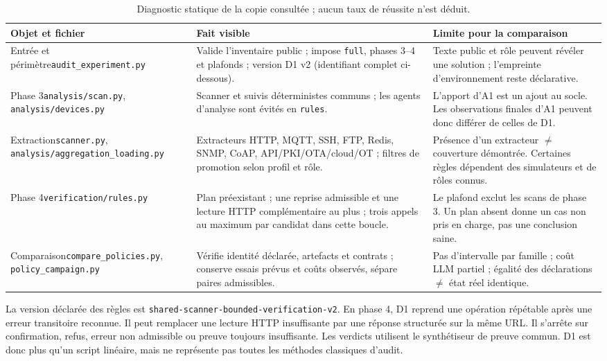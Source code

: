 \documentclass[11pt,a4paper]{article}
\newcommand{\fichier}[1]{\nolinkurl{#1}}
\begin{document}
\begin{table}[htbp]
\caption{Diagnostic statique de la copie consultée ; aucun taux de réussite n'est déduit.}
\label{tab:code}
\small
\begin{tabularx}{\linewidth}{@{}p{.23\linewidth}Y Y@{}}
\toprule
Objet et fichier & Fait visible & Limite pour la comparaison \\
\midrule
Entrée et périmètre\newline\fichier{audit_experiment.py}
& Valide l'inventaire public ; impose \texttt{full}, phases 3--4 et plafonds ; version D1 v2 (identifiant complet ci-dessous).
& Texte public et rôle peuvent révéler une solution ; l'empreinte d'environnement reste déclarative. \\
Phase 3\newline\fichier{analysis/scan.py}, \fichier{analysis/devices.py}
& Scanner et suivis déterministes communs ; les agents d'analyse sont évités en \texttt{rules}.
& L'apport d'A1 est un ajout au socle. Les observations finales d'A1 peuvent donc différer de celles de D1. \\
Extraction\newline\fichier{scanner.py}, \fichier{analysis/aggregation_loading.py}
& Extracteurs HTTP, MQTT, SSH, FTP, Redis, SNMP, CoAP, API/PKI/OTA/cloud/OT ; filtres de promotion selon profil et rôle.
& Présence d'un extracteur $\neq$ couverture démontrée. Certaines règles dépendent des simulateurs et de rôles connus. \\
Phase 4\newline\fichier{verification/rules.py}
& Plan préexistant ; une reprise admissible et une lecture HTTP complémentaire au plus ; trois appels au maximum par candidat dans cette boucle.
& Le plafond exclut les scans de phase 3. Un plan absent donne un cas non pris en charge, pas une conclusion saine. \\
Comparaison\newline\fichier{compare_policies.py}, \fichier{policy_campaign.py}
& Vérifie identité déclarée, artefacts et contrats ; conserve essais prévus et coûts observés, sépare paires admissibles.
& Pas d'intervalle par famille ; coût LLM partiel ; égalité des déclarations $\neq$ état réel identique. \\
\bottomrule
\end{tabularx}
\end{table}

La version déclarée des règles est
\fichier{shared-scanner-bounded-verification-v2}.
En phase 4, D1 reprend une opération répétable après une erreur transitoire
reconnue. Il peut remplacer une lecture HTTP insuffisante par une réponse
structurée sur la même URL. Il s'arrête sur confirmation, refus, erreur non
admissible ou preuve toujours insuffisante. Les verdicts utilisent le
synthétiseur de preuve commun. D1 est donc plus qu'un script linéaire,
mais ne représente pas toutes les méthodes classiques d'audit.
\end{document}
